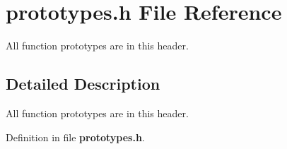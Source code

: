 \section{prototypes.h File Reference}
\label{prototypes_8h}


All function prototypes are in this header.  




\subsection{Detailed Description}
All function prototypes are in this header. 

Definition in file {\bf prototypes.h}.

